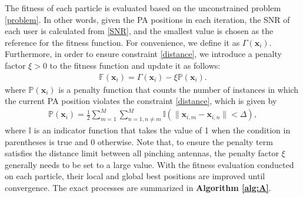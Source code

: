 \documentclass[summary]{ursi}
\begin{document}
The fitness of each particle is evaluated based on the unconstrained problem \eqref{problem}. In other words, given the PA positions in each iteration, the SNR of each user is calculated from \eqref{SNR}, and the smallest value is chosen as the reference for the fitness function. For convenience, we define it as $\Gamma(\mathbf{x}_i)$. Furthermore, in order to ensure constraint \eqref{distance}, we introduce a penalty factor $\xi>0$ to the fitness function and update it as follows:
\begin{align} \label{Fitness}
	\mathbb{F}(\mathbf{x}_i)=\Gamma(\mathbf{x}_i)-\xi\mathbb{P}(\mathbf{x}_i).
\end{align}
where $\mathbb{P}(\mathbf{x}_i)$ is a penalty function that counts the number of instances in which the current PA position violates the constraint \eqref{distance}, which is given by
\begin{align}
	\mathbb{P}(\mathbf{x}_i)=\frac{1}{2}\sum_{m=1}^{M}\sum_{n=1,n\ne m}^{M} \mathbb{I}(\|\mathbf{x}_{i,m}-\mathbf{x}_{i,n}\|<\Delta),
\end{align}
where $\mathbb{I}$ is an indicator function that takes the value of 1 when the condition in parentheses is true and 0 otherwise. Note that, to ensure the penalty term satisfies the distance limit between all pinching antennas, the penalty factor $\xi$ generally needs to be set to a large value. With the fitness evaluation conducted on each particle, their local and global best positions are improved until convergence. The exact processes are summarized in \textbf{Algorithm \ref{alg:A}}.
\end{document}
